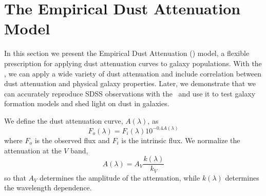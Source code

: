 \section{The Empirical Dust Attenuation Model} \label{sec:dem}
In this section we present the Empirical Dust Attenuation (\eda) model, a
flexible prescription for applying dust attenuation curves to galaxy
populations. With the \eda, we can apply a wide variety of dust attenuation and
include correlation between dust attenuation and physical galaxy properties. 
Later, we demonstrate that we can accurately reproduce SDSS observations with
the \eda~and use it to test galaxy formation models and shed light on dust in
galaxies. 

We define the dust attenuation curve, $A(\lambda)$, as 
\begin{equation} \label{eq:full_atten}
    F_o (\lambda) = F_i (\lambda) 10^{-0.4 A(\lambda)}
\end{equation}
where $F_o$ is the observed flux and $F_i$ is the intrinsic flux. We normalize
the attenuation at the $V$ band, 
\begin{equation} 
    A(\lambda) = A_V \frac{k(\lambda)}{k_V}
\end{equation}
so that $A_V$ determines the amplitude of the attenuation, while $k(\lambda)$
determines the wavelength dependence. 

